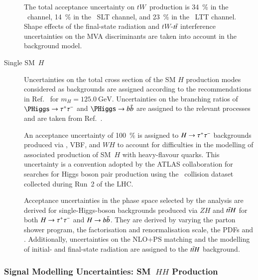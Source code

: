 \begin{description}
  The total acceptance uncertainty on $tW$~production is \SI{34}{\percent} in
  the \hadhad~channel, \SI{14}{\percent} in the \lephad~SLT channel, and
  \SI{23}{\percent} in the \lephad~LTT channel. Shape effects of the final-state
  radiation and $tW$-$t\bar{t}$ interference uncertainties on the MVA
  discriminants are taken into account in the background model.

\item[Single SM~$H$] Uncertainties on the total cross section of the SM $H$
  production modes considered as backgrounds are assigned according to the
  recommendations in Ref.~\cite{deFlorian:2016spz_book} for
  $m_{H} = \SI{125.0}{\GeV}$. Uncertainties on the branching ratios of
  $\PHiggs \to \tautau$ and $\PHiggs \to \bbbar$ are assigned to the relevant
  processes and are taken from Ref.~\cite{deFlorian:2016spz_book}.

  An acceptance uncertainty of \SI{100}{\percent} is assigned to $H \to \tau^{+} \tau^{-}$
  backgrounds produced via \ggF, VBF, and $WH$ to account for difficulties in
  the modelling of associated production of SM~$H$ with heavy-flavour
  quarks. This uncertainty is a convention adopted by the ATLAS collaboration
  for searches for Higgs boson pair production using the \pp~collision dataset
  collected during Run~2 of the LHC.

  Acceptance uncertainties in the phase space selected by the analysis are
  derived for single-Higgs-boson backgrounds produced via $ZH$ and $t\bar{t} H$
  for both $H \to \tau^{+} \tau^{-}$ and $H \to b\bar{b}$. They are derived by varying the
  parton shower program, the factorisation and renormalisation scale, the PDFs
  and \alphas. Additionally, uncertainties on the NLO+PS matching and the
  modelling of initial- and final-state radiation are assigned to the $t\bar{t} H$
  background.
\end{description}





\subsubsection{Signal Modelling Uncertainties: SM~$HH$ Production}


